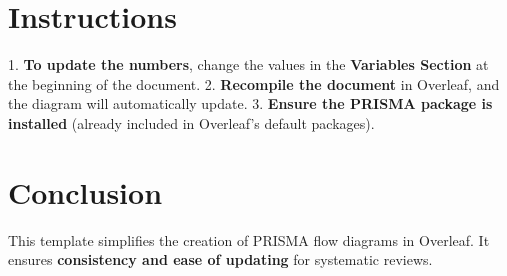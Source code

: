 \documentclass{article}
\begin{document}
\section{Instructions}
1. \textbf{To update the numbers}, change the values in the \textbf{Variables Section} at the beginning of the document.
2. \textbf{Recompile the document} in Overleaf, and the diagram will automatically update.
3. \textbf{Ensure the PRISMA package is installed} (already included in Overleaf's default packages).

\section{Conclusion}
This template simplifies the creation of PRISMA flow diagrams in Overleaf. It ensures \textbf{consistency and ease of updating} for systematic reviews.
\end{document}
